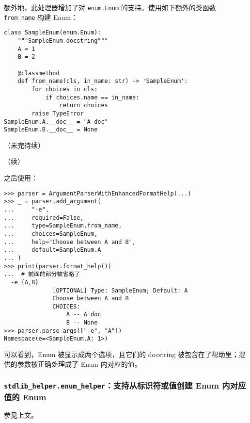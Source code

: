 \documentclass[pdf,9pt]{beamer}
\begin{document}
    \begin{frame}[fragile]{\subsubsecname}
        额外地，此处理器增加了对 \Verb|enum.Enum| 的支持。使用如下额外的类函数 \Verb|from_name| 构建 Enum：

        \begin{verbatim}
class SampleEnum(enum.Enum):
    """SampleEnum docstring"""
    A = 1
    B = 2

    @classmethod
    def from_name(cls, in_name: str) -> 'SampleEnum':
        for choices in cls:
            if choices.name == in_name:
                return choices
        raise TypeError
SampleEnum.A.__doc__ = "A doc"
SampleEnum.B.__doc__ = None
        \end{verbatim}

        （未完待续）
    \end{frame}
    
    \begin{frame}[fragile]{\subsubsecname}
        （续）

        之后使用：

        \begin{verbatim}
>>> parser = ArgumentParserWithEnhancedFormatHelp(...)
>>> _ = parser.add_argument(
...     "-e",
...     required=False,
...     type=SampleEnum.from_name,
...     choices=SampleEnum,
...     help="Choose between A and B",
...     default=SampleEnum.A
... )
>>> print(parser.format_help())
...  # 前面的部分被省略了
  -e {A,B}
              [OPTIONAL] Type: SampleEnum; Default: A
              Choose between A and B
              CHOICES:
                  A -- A doc
                  B -- None
>>> parser.parse_args(["-e", "A"])
Namespace(e=<SampleEnum.A: 1>)
        \end{verbatim}

        可以看到，Enum 被显示成两个选项，且它们的 docstring 被包含在了帮助里；提供的参数被正确处理成了 Enum 内对应的值。
    \end{frame}

    \subsubsection{\texttt{stdlib\_helper.enum\_helper}：支持从标识符或值创建 Enum 内对应值的 Enum}
    \begin{frame}{\subsubsecname}
        参见上文。
    \end{frame}
\end{document}
